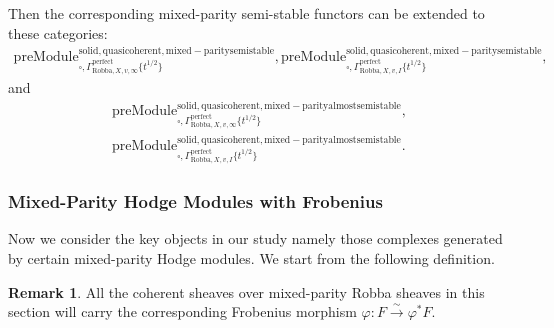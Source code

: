\documentclass[12pt]{book}
\theoremstyle{definition}
\newtheorem{remark}{Remark}
\begin{document}
\indent Then the corresponding mixed-parity semi-stable functors can be extended to these categories:
\begin{align}
\mathrm{preModule}^\mathrm{solid,quasicoherent,mixed-paritysemistable}_{\square,\Gamma^\mathrm{perfect}_{\text{Robba},X,v,\infty}\{t^{1/2}\}},
\mathrm{preModule}^\mathrm{solid,quasicoherent,mixed-paritysemistable}_{\square,\Gamma^\mathrm{perfect}_{\text{Robba},X,v,I}\{t^{1/2}\}}, 
\end{align}
and
\begin{align}
\mathrm{preModule}^\mathrm{solid,quasicoherent,mixed-parityalmostsemistable}_{\square,\Gamma^\mathrm{perfect}_{\text{Robba},X,v,\infty}\{t^{1/2}\}},\\
\mathrm{preModule}^\mathrm{solid,quasicoherent,mixed-parityalmostsemistable}_{\square,\Gamma^\mathrm{perfect}_{\text{Robba},X,v,I}\{t^{1/2}\}}. 
\end{align}



\subsubsection{Mixed-Parity Hodge Modules with Frobenius}


\noindent Now we consider the key objects in our study namely those complexes generated by certain mixed-parity Hodge modules. We start from the following definition.

\begin{remark}
All the coherent sheaves over mixed-parity Robba sheaves in this section will carry the corresponding Frobenius morphism $\varphi: F \overset{\sim}{\longrightarrow} \varphi^*F$.
\end{remark}
\end{document}
